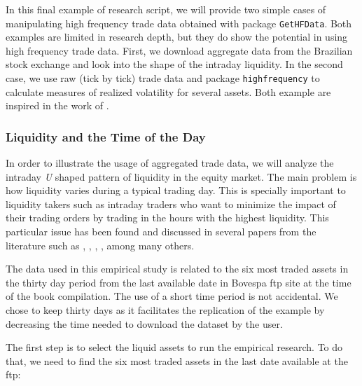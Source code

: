 \documentclass[11pt,]{book}
\begin{document}
In this final example of research script, we will provide two simple
cases of manipulating high frequency trade data obtained with package
\texttt{GetHFData}. Both examples are limited in research depth, but
they do show the potential in using high frequency trade data. First, we
download aggregate data from the Brazilian stock exchange and look into
the shape of the intraday liquidity. In the second case, we use raw
(tick by tick) trade data and package \texttt{highfrequency}
\citep{highfrequency} to calculate measures of realized volatility for
several assets. Both example are inspired in the work of
\citet{gethfdata}.

\subsubsection{Liquidity and the Time of the
Day}\label{liquidity-and-the-time-of-the-day}

In order to illustrate the usage of aggregated trade data, we will
analyze the intraday \emph{U} shaped pattern of liquidity in the equity
market. The main problem is how liquidity varies during a typical
trading day. This is specially important to liquidity takers such as
intraday traders who want to minimize the impact of their trading orders
by trading in the hours with the highest liquidity. This particular
issue has been found and discussed in several papers from the literature
such as \citet{admati1988theory}, \citet{back1998long} ,
\citet{engle1998autoregressive}, \citet{gross2011machines}, among many
others.

The data used in this empirical study is related to the six most traded
assets in the thirty day period from the last available date in Bovespa
ftp site at the time of the book compilation. The use of a short time
period is not accidental. We chose to keep thirty days as it facilitates
the replication of the example by decreasing the time needed to download
the dataset by the user.

The first step is to select the liquid assets to run the empirical
research. To do that, we need to find the six most traded assets in the
last date available at the ftp:
\end{document}
